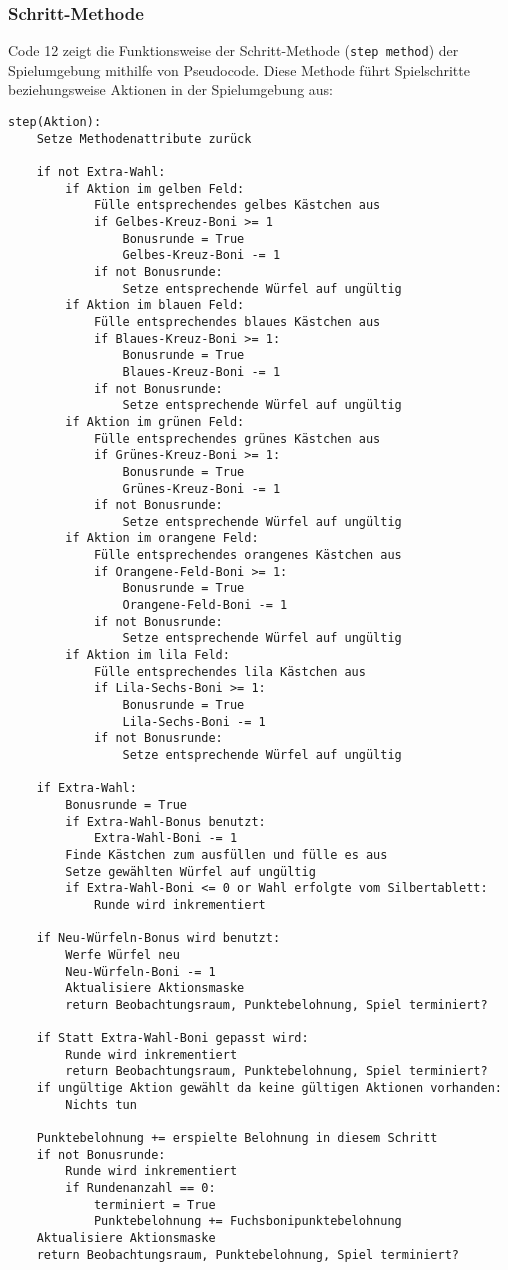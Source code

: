 \subsubsection{Schritt-Methode}
Code 12 zeigt die Funktionsweise der Schritt-Methode (\texttt{step method}) der Spielumgebung mithilfe von Pseudocode. Diese Methode führt Spielschritte beziehungsweise Aktionen in der Spielumgebung aus:
\vspace{0.5cm}
\begin{lstlisting}[caption={Schritt-Methode}]
step(Aktion):
	Setze Methodenattribute zurück
	
	if not Extra-Wahl:
		if Aktion im gelben Feld:
			Fülle entsprechendes gelbes Kästchen aus
			if Gelbes-Kreuz-Boni >= 1
				Bonusrunde = True
				Gelbes-Kreuz-Boni -= 1
			if not Bonusrunde:
				Setze entsprechende Würfel auf ungültig
		if Aktion im blauen Feld:
			Fülle entsprechendes blaues Kästchen aus
			if Blaues-Kreuz-Boni >= 1:
				Bonusrunde = True
				Blaues-Kreuz-Boni -= 1
			if not Bonusrunde:
				Setze entsprechende Würfel auf ungültig
		if Aktion im grünen Feld:
			Fülle entsprechendes grünes Kästchen aus
			if Grünes-Kreuz-Boni >= 1:
				Bonusrunde = True
				Grünes-Kreuz-Boni -= 1
			if not Bonusrunde:
				Setze entsprechende Würfel auf ungültig
		if Aktion im orangene Feld:
			Fülle entsprechendes orangenes Kästchen aus
			if Orangene-Feld-Boni >= 1:
				Bonusrunde = True
				Orangene-Feld-Boni -= 1
			if not Bonusrunde:
				Setze entsprechende Würfel auf ungültig
		if Aktion im lila Feld:
			Fülle entsprechendes lila Kästchen aus
			if Lila-Sechs-Boni >= 1:
				Bonusrunde = True
				Lila-Sechs-Boni -= 1
			if not Bonusrunde:
				Setze entsprechende Würfel auf ungültig
	
	if Extra-Wahl:
		Bonusrunde = True
		if Extra-Wahl-Bonus benutzt:
			Extra-Wahl-Boni -= 1
		Finde Kästchen zum ausfüllen und fülle es aus
		Setze gewählten Würfel auf ungültig
		if Extra-Wahl-Boni <= 0 or Wahl erfolgte vom Silbertablett:
			Runde wird inkrementiert
			
	if Neu-Würfeln-Bonus wird benutzt:
		Werfe Würfel neu
		Neu-Würfeln-Boni -= 1
		Aktualisiere Aktionsmaske
		return Beobachtungsraum, Punktebelohnung, Spiel terminiert?
		
	if Statt Extra-Wahl-Boni gepasst wird:
		Runde wird inkrementiert
		return Beobachtungsraum, Punktebelohnung, Spiel terminiert?
	if ungültige Aktion gewählt da keine gültigen Aktionen vorhanden:
		Nichts tun
			
	Punktebelohnung += erspielte Belohnung in diesem Schritt
	if not Bonusrunde:
		Runde wird inkrementiert
		if Rundenanzahl == 0:
			terminiert = True
			Punktebelohnung += Fuchsbonipunktebelohnung
	Aktualisiere Aktionsmaske
	return Beobachtungsraum, Punktebelohnung, Spiel terminiert?		
\end{lstlisting}
